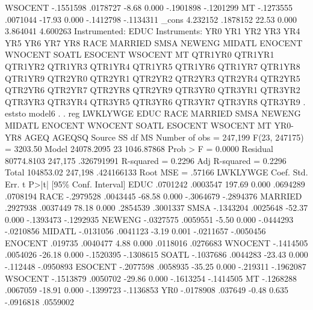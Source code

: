      WSOCENT {\VBAR}  -.1551598   .0178727    -8.68   0.000    -.1901898   -.1201299
          MT {\VBAR}  -.1273555   .0071044   -17.93   0.000    -.1412798   -.1134311
       _cons {\VBAR}   4.232152   .1878152    22.53   0.000     3.864041    4.600263
Instrumented:  EDUC
Instruments:   YR0 YR1 YR2 YR3 YR4 YR5 YR6 YR7 YR8 RACE MARRIED SMSA NEWENG
               MIDATL ENOCENT WNOCENT SOATL ESOCENT WSOCENT MT QTR1YR0
               QTR1YR1 QTR1YR2 QTR1YR3 QTR1YR4 QTR1YR5 QTR1YR6 QTR1YR7
               QTR1YR8 QTR1YR9 QTR2YR0 QTR2YR1 QTR2YR2 QTR2YR3 QTR2YR4
               QTR2YR5 QTR2YR6 QTR2YR7 QTR2YR8 QTR2YR9 QTR3YR0 QTR3YR1
               QTR3YR2 QTR3YR3 QTR3YR4 QTR3YR5 QTR3YR6 QTR3YR7 QTR3YR8
               QTR3YR9
{\smallskip}
. eststo model6
{\smallskip}
. 
. reg  LWKLYWGE EDUC  RACE MARRIED SMSA NEWENG MIDATL ENOCENT WNOCENT SOATL ESOCENT WSOCENT MT YR0-YR8 AGEQ AGEQSQ 
{\smallskip}
      Source {\VBAR}       SS           df       MS      Number of obs   =   247,199
   F(23, 247175)   =   3203.50
       Model {\VBAR}  24078.2095        23  1046.87868   Prob > F        =    0.0000
    Residual {\VBAR}  80774.8103   247,175  .326791991   R-squared       =    0.2296
   Adj R-squared   =    0.2296
       Total {\VBAR}   104853.02   247,198  .424166133   Root MSE        =    .57166
{\smallskip}
    LWKLYWGE {\VBAR}      Coef.   Std. Err.      t    P>|t|     [95\% Conf. Interval]
        EDUC {\VBAR}   .0701242   .0003547   197.69   0.000     .0694289    .0708194
        RACE {\VBAR}  -.2979528   .0043445   -68.58   0.000    -.3064679   -.2894376
     MARRIED {\VBAR}   .2927938   .0037449    78.18   0.000     .2854539    .3001337
        SMSA {\VBAR}  -.1343204   .0025648   -52.37   0.000    -.1393473   -.1292935
      NEWENG {\VBAR}  -.0327575   .0059551    -5.50   0.000    -.0444293   -.0210856
      MIDATL {\VBAR}  -.0131056   .0041123    -3.19   0.001    -.0211657   -.0050456
     ENOCENT {\VBAR}    .019735   .0040477     4.88   0.000     .0118016    .0276683
     WNOCENT {\VBAR}  -.1414505   .0054026   -26.18   0.000    -.1520395   -.1308615
       SOATL {\VBAR}  -.1037686   .0044283   -23.43   0.000     -.112448   -.0950893
     ESOCENT {\VBAR}  -.2077598   .0058935   -35.25   0.000     -.219311   -.1962087
     WSOCENT {\VBAR}  -.1513879   .0050702   -29.86   0.000    -.1613254   -.1414505
          MT {\VBAR}  -.1268288   .0067059   -18.91   0.000    -.1399723   -.1136853
         YR0 {\VBAR}  -.0178908    .037649    -0.48   0.635    -.0916818    .0559002
